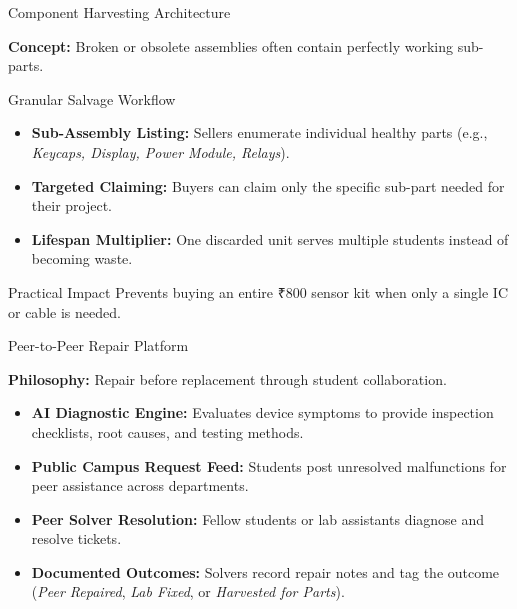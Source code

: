 \documentclass{beamer}
\begin{document}
\begin{frame}{Component Harvesting Architecture}

\textbf{Concept:} Broken or obsolete assemblies often contain perfectly working sub-parts.

\vspace{0.25cm}
\begin{block}{Granular Salvage Workflow}
\begin{itemize}
    \setlength\itemsep{0.2cm}
    \item \textbf{Sub-Assembly Listing:} Sellers enumerate individual healthy parts (e.g., \textit{Keycaps, Display, Power Module, Relays}).
    \item \textbf{Targeted Claiming:} Buyers can claim only the specific sub-part needed for their project.
    \item \textbf{Lifespan Multiplier:} One discarded unit serves multiple students instead of becoming waste.
\end{itemize}
\end{block}

\vspace{0.2cm}
\begin{exampleblock}{Practical Impact}
\small Prevents buying an entire ₹800 sensor kit when only a single IC or cable is needed.
\end{exampleblock}

\end{frame}


\begin{frame}{Peer-to-Peer Repair Platform}

\textbf{Philosophy:} Repair before replacement through student collaboration.

\vspace{0.25cm}
\begin{itemize}
    \setlength\itemsep{0.25cm}
    \item \textbf{AI Diagnostic Engine:} Evaluates device symptoms to provide inspection checklists, root causes, and testing methods.

    \item \textbf{Public Campus Request Feed:} Students post unresolved malfunctions for peer assistance across departments.

    \item \textbf{Peer Solver Resolution:} Fellow students or lab assistants diagnose and resolve tickets.

    \item \textbf{Documented Outcomes:} Solvers record repair notes and tag the outcome (\textit{Peer Repaired}, \textit{Lab Fixed}, or \textit{Harvested for Parts}).
\end{itemize}

\end{frame}
\end{document}
